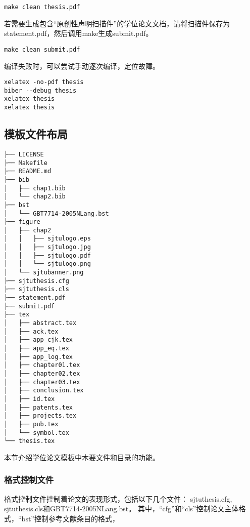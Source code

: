 \begin{lstlisting}[basicstyle=\small\ttfamily, caption={编译模板}, numbers=none]
make clean thesis.pdf
\end{lstlisting}

若需要生成包含“原创性声明扫描件”的学位论文文档，请将扫描件保存为statement.pdf，然后调用make生成submit.pdf。

\begin{lstlisting}[basicstyle=\small\ttfamily, caption={生成用于提交的学位论文}, numbers=none]
make clean submit.pdf
\end{lstlisting}

编译失败时，可以尝试手动逐次编译，定位故障。

\begin{lstlisting}[basicstyle=\small\ttfamily, caption={手动逐次编译}, numbers=none]
xelatex -no-pdf thesis
biber --debug thesis
xelatex thesis
xelatex thesis
\end{lstlisting}

\subsection{模板文件布局}
\label{sec:layout}

\begin{lstlisting}[basicstyle=\small\ttfamily,caption={模板文件布局},label=layout,float,numbers=none]
├── LICENSE
├── Makefile
├── README.md
├── bib
│   ├── chap1.bib
│   └── chap2.bib
├── bst
│   └── GBT7714-2005NLang.bst
├── figure
│   ├── chap2
│   │   ├── sjtulogo.eps
│   │   ├── sjtulogo.jpg
│   │   ├── sjtulogo.pdf
│   │   └── sjtulogo.png
│   └── sjtubanner.png
├── sjtuthesis.cfg
├── sjtuthesis.cls
├── statement.pdf
├── submit.pdf
├── tex
│   ├── abstract.tex
│   ├── ack.tex
│   ├── app_cjk.tex
│   ├── app_eq.tex
│   ├── app_log.tex
│   ├── chapter01.tex
│   ├── chapter02.tex
│   ├── chapter03.tex
│   ├── conclusion.tex
│   ├── id.tex
│   ├── patents.tex
│   ├── projects.tex
│   ├── pub.tex
│   └── symbol.tex
└── thesis.tex
\end{lstlisting}

本节介绍学位论文模板中木要文件和目录的功能。

\subsubsection{格式控制文件}
\label{sec:format}

格式控制文件控制着论文的表现形式，包括以下几个文件：
sjtuthesis.cfg, sjtuthesis.cls和GBT7714-2005NLang.bst。
其中，“cfg”和“cls”控制论文主体格式，“bst”控制参考文献条目的格式，

